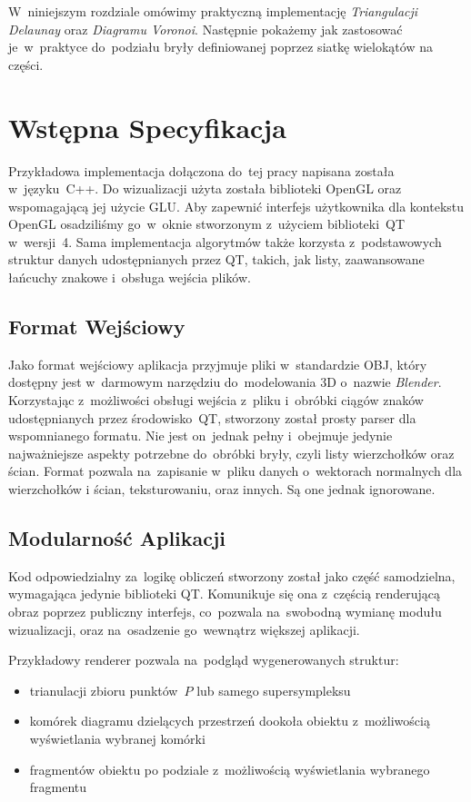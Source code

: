 \documentclass[skorowidz,autorrok,backref,xodstep,oswiadczenie]{wmimgr}
\begin{document}
W~niniejszym rozdziale omówimy praktyczną implementację \emph{Triangulacji Delaunay} oraz \emph{Diagramu Voronoi}. Następnie pokażemy jak zastosować je~w~praktyce do~podziału bryły definiowanej poprzez siatkę wielokątów na części.

\section{Wstępna Specyfikacja}

Przykładowa implementacja dołączona do~tej pracy napisana została w~języku~C++. Do wizualizacji użyta została biblioteki OpenGL oraz wspomagającą jej użycie GLU. Aby zapewnić interfejs użytkownika dla kontekstu OpenGL osadziliśmy go~w~oknie stworzonym z~użyciem biblioteki~QT w~wersji~4. Sama implementacja algorytmów także korzysta z~podstawowych struktur danych udostępnianych przez QT, takich, jak listy, zaawansowane łańcuchy znakowe i~obsługa wejścia plików.

\subsection{Format Wejściowy}

Jako format wejściowy aplikacja przyjmuje pliki w~standardzie OBJ, który dostępny jest w~darmowym narzędziu do~modelowania 3D o~nazwie \emph{Blender}. Korzystając z~możliwości obsługi wejścia z~pliku i~obróbki ciągów znaków udostępnianych przez środowisko~QT, stworzony został prosty parser dla wspomnianego formatu. Nie jest on~jednak pełny i~obejmuje jedynie najważniejsze aspekty potrzebne do~obróbki bryły, czyli listy wierzchołków oraz ścian. Format pozwala na~zapisanie w~pliku danych o~wektorach normalnych dla wierzchołków i ścian, teksturowaniu, oraz innych. Są one jednak ignorowane.

\subsection{Modularność Aplikacji}

Kod odpowiedzialny za~logikę obliczeń stworzony został jako część samodzielna, wymagająca jedynie biblioteki QT. Komunikuje się ona z~częścią renderującą obraz poprzez publiczny interfejs, co~pozwala na~swobodną wymianę modułu wizualizacji, oraz na~osadzenie go~wewnątrz większej aplikacji.

Przykładowy renderer pozwala na~podgląd wygenerowanych struktur:
\begin{itemize}
\item
trianulacji zbioru punktów~$P$ lub samego supersympleksu
\item
komórek diagramu dzielących przestrzeń dookoła obiektu z~możliwością wyświetlania wybranej komórki
\item
fragmentów obiektu po podziale z~możliwością wyświetlania wybranego fragmentu
\end{itemize}
\end{document}
